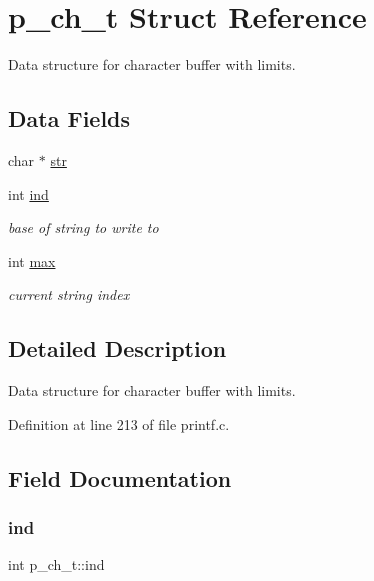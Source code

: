 \hypertarget{structp__ch__t}{}\section{p\+\_\+ch\+\_\+t Struct Reference}
\label{structp__ch__t}


Data structure for character buffer with limits.  


\subsection*{Data Fields}
\begin{DoxyCompactItemize}
\item 
char $\ast$ \hyperlink{structp__ch__t_aa3c8616342a2717bc714bf1b6d00516f}{str}
\item 
int \hyperlink{structp__ch__t_a9d6834d749cd9232a16cb20b598fe90d}{ind}
\begin{DoxyCompactList}\small\item\em base of string to write to \end{DoxyCompactList}\item 
int \hyperlink{structp__ch__t_a0dee9f28e498d427e53051b7e1846d34}{max}
\begin{DoxyCompactList}\small\item\em current string index \end{DoxyCompactList}\end{DoxyCompactItemize}


\subsection{Detailed Description}
Data structure for character buffer with limits. 

Definition at line 213 of file printf.\+c.



\subsection{Field Documentation}
\mbox{\label{structp__ch__t_a9d6834d749cd9232a16cb20b598fe90d}} 
\subsubsection{\texorpdfstring{ind}{ind}}
{\footnotesize\ttfamily int p\+\_\+ch\+\_\+t\+::ind}



